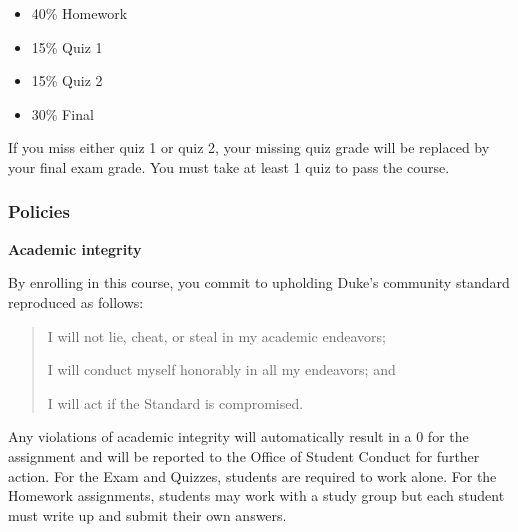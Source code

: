 \documentclass[
  letterpaper,
  DIV=11,
  numbers=noendperiod]{scrartcl}
\providecommand{\tightlist}{%
  \setlength{\itemsep}{0pt}\setlength{\parskip}{0pt}}\usepackage{longtable,booktabs,array}
\begin{document}
\begin{itemize}
\tightlist
\item
  40\% Homework
\item
  15\% Quiz 1
\item
  15\% Quiz 2
\item
  30\% Final
\end{itemize}

If you miss either quiz 1 or quiz 2, your missing quiz grade will be
replaced by your final exam grade. You must take at least 1 quiz to pass
the course.

\hypertarget{policies}{%
\subsubsection{Policies}\label{policies}}

\textbf{Academic integrity}

By enrolling in this course, you commit to upholding Duke's community
standard reproduced as follows:

\begin{quote}
I will not lie, cheat, or steal in my academic endeavors;

I will conduct myself honorably in all my endeavors; and

I will act if the Standard is compromised.
\end{quote}

Any violations of academic integrity will automatically result in a 0
for the assignment and will be reported to the Office of Student Conduct
for further action. For the Exam and Quizzes, students are required to
work alone. For the Homework assignments, students may work with a study
group but each student must write up and submit their own answers.
\end{document}
